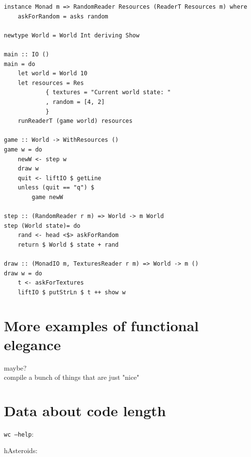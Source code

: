\documentclass[
  digital, %
  color,   %
  table,   %
  oneside, %
  lof,     %
  lot,     %
]{fithesis3}
\begin{document}
{\begin{verbatim}
instance Monad m => RandomReader Resources (ReaderT Resources m) where
    askForRandom = asks random

newtype World = World Int deriving Show

main :: IO ()
main = do
    let world = World 10
    let resources = Res  
            { textures = "Current world state: "
            , random = [4, 2]
            }
    runReaderT (game world) resources  

game :: World -> WithResources ()
game w = do
    newW <- step w
    draw w
    quit <- liftIO $ getLine
    unless (quit == "q") $
        game newW

step :: (RandomReader r m) => World -> m World
step (World state)= do
    rand <- head <$> askForRandom
    return $ World $ state + rand

draw :: (MonadIO m, TexturesReader r m) => World -> m ()
draw w = do
    t <- askForTextures
    liftIO $ putStrLn $ t ++ show w

\end{verbatim}





\chapter{More examples of functional elegance}
\label{app:elegance}
maybe?\\
compile a bunch of things that are just "nice"




\chapter{Data about code length}

\texttt{wc --help}: 

hAsteroids:

}
\end{document}
